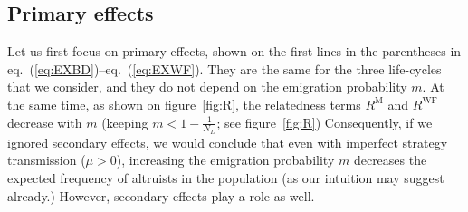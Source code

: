 \documentclass[11pt, letterpaper]{article}
\renewcommand{\eqref}[1]{\textup{{\normalfont eq.~(\ref{#1}}\normalfont)}}
\newcommand{\Moran}{\textrm{M}}
\newcommand{\WF}{\textrm{WF}}
\newcommand{\ndemes}{N_D}
\begin{document}
\subsection{Primary effects}

Let us first focus on primary effects, shown on the first lines in the parentheses in \eqref{eq:EXBD}--\eqref{eq:EXWF}. They are the same for the three life-cycles that we consider, and they do not depend on the emigration probability $m$. At the same time, as shown on figure~\ref{fig:R}, the relatedness terms $R^{\Moran}$ and $R^{\WF}$ decrease with $m$ (keeping $m<1 - \frac{1}{\ndemes}$; see figure~\ref{fig:R}) Consequently, if we ignored secondary effects, we would conclude that even with imperfect strategy transmission ($\mu>0$), increasing the emigration probability $m$ decreases the expected frequency of altruists in the population (as our intuition may suggest already.) However, secondary effects play a role as well.
\end{document}
